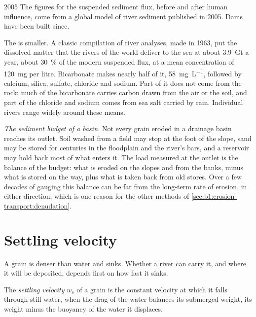 \begin{dated}{2005}
The figures for the suspended sediment flux, before and after human influence,
come from a global model of river sediment published in 2005. Dams have been
built since.
\end{dated}

The  is smaller. A classic compilation of river analyses, made in
1963, put the dissolved matter that the rivers of the world deliver to the sea
at about \qty{3.9}{Gt} a year, about \qty{30}{\percent} of the modern suspended
flux, at a mean concentration of \qty{120}{mg} per litre. Bicarbonate makes
nearly half of it, \qty{58}{mg.L^{-1}}, followed by calcium, silica, sulfate,
chloride and sodium. Part of it does not come from the rock: much of the
bicarbonate carries carbon drawn from the air or the soil, and part of the
chloride and sodium comes from sea salt carried by rain. Individual rivers range
widely around these means.

\emph{The sediment budget of a basin.} Not every grain eroded in a drainage
basin reaches its outlet. Soil washed from a field may stop at the foot of the
slope, sand may be stored for centuries in the floodplain and the river's bars,
and a reservoir may hold back most of what enters it. The load measured at the
outlet is the balance of the budget: what is eroded on the slopes and from the
banks, minus what is stored on the way, plus what is taken back from old
stores. Over a few decades of gauging this balance can be far from the
long-term rate of erosion, in either direction, which is one reason for the
other methods of \cref{sec:b1:erosion-transport:denudation}.

\section{Settling velocity}\label{sec:b1:erosion-transport:settling}

A grain is denser than water and sinks. Whether a river can carry it, and
where it will be deposited, depends first on how fast it sinks.

\begin{definition}\label{def:b1:erosion-transport:settling}
The \emph{settling velocity} $w_s$ of a grain is the
constant velocity at which it falls through still water, when the drag of the
water balances its submerged weight, its weight minus the buoyancy of the
water it displaces.
\end{definition}

